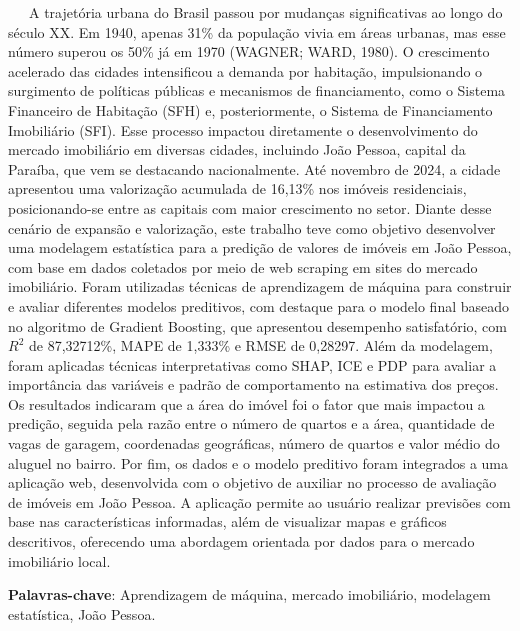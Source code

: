 \documentclass[
  12pt,
  a4paper,
]{scrreprt}
\begin{document}
~~~A trajetória urbana do Brasil passou por mudanças significativas ao
longo do século XX. Em 1940, apenas 31\% da população vivia em áreas
urbanas, mas esse número superou os 50\% já em 1970 (WAGNER; WARD,
1980). O crescimento acelerado das cidades intensificou a demanda por
habitação, impulsionando o surgimento de políticas públicas e mecanismos
de financiamento, como o Sistema Financeiro de Habitação (SFH) e,
posteriormente, o Sistema de Financiamento Imobiliário (SFI). Esse
processo impactou diretamente o desenvolvimento do mercado imobiliário
em diversas cidades, incluindo João Pessoa, capital da Paraíba, que vem
se destacando nacionalmente. Até novembro de 2024, a cidade apresentou
uma valorização acumulada de 16,13\% nos imóveis residenciais,
posicionando-se entre as capitais com maior crescimento no setor. Diante
desse cenário de expansão e valorização, este trabalho teve como
objetivo desenvolver uma modelagem estatística para a predição de
valores de imóveis em João Pessoa, com base em dados coletados por meio
de web scraping em sites do mercado imobiliário. Foram utilizadas
técnicas de aprendizagem de máquina para construir e avaliar diferentes
modelos preditivos, com destaque para o modelo final baseado no
algoritmo de Gradient Boosting, que apresentou desempenho satisfatório,
com \(R^2\) de 87,32712\%, MAPE de 1,333\% e RMSE de 0,28297. Além da
modelagem, foram aplicadas técnicas interpretativas como SHAP, ICE e PDP
para avaliar a importância das variáveis e padrão de comportamento na
estimativa dos preços. Os resultados indicaram que a área do imóvel foi
o fator que mais impactou a predição, seguida pela razão entre o número
de quartos e a área, quantidade de vagas de garagem, coordenadas
geográficas, número de quartos e valor médio do aluguel no bairro. Por
fim, os dados e o modelo preditivo foram integrados a uma aplicação web,
desenvolvida com o objetivo de auxiliar no processo de avaliação de
imóveis em João Pessoa. A aplicação permite ao usuário realizar
previsões com base nas características informadas, além de visualizar
mapas e gráficos descritivos, oferecendo uma abordagem orientada por
dados para o mercado imobiliário local.

\begin{flushleft}
\textbf{Palavras-chave}: Aprendizagem de máquina, mercado imobiliário, modelagem estatística, João Pessoa.
\end{flushleft}

\thispagestyle{empty}

\newpage
\end{document}
